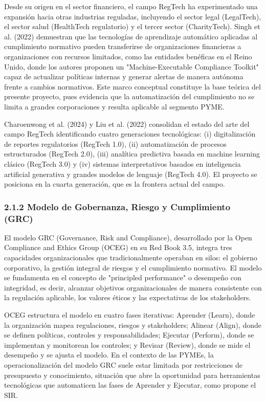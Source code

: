 \documentclass[12pt,a4paper,oneside]{report}
\begin{document}
Desde su origen en el sector financiero, el campo RegTech ha
experimentado una expansión hacia otras industrias reguladas, incluyendo
el sector legal (LegalTech), el sector salud (HealthTech regulatorio) y
el tercer sector (CharityTech). Singh et al. (2022) demuestran que las
tecnologías de aprendizaje automático aplicadas al cumplimiento
normativo pueden transferirse de organizaciones financieras a
organizaciones con recursos limitados, como las entidades benéficas en
el Reino Unido, donde los autores proponen un "Machine-Executable
Compliance Toolkit" capaz de actualizar políticas internas y generar
alertas de manera autónoma frente a cambios normativos. Este marco
conceptual constituye la base teórica del presente proyecto, pues
evidencia que la automatización del cumplimiento no se limita a grandes
corporaciones y resulta aplicable al segmento PYME.

Charoenwong et al. (2024) y Liu et al. (2022) consolidan el estado del
arte del campo RegTech identificando cuatro generaciones tecnológicas:
(i) digitalización de reportes regulatorios (RegTech 1.0), (ii)
automatización de procesos estructurados (RegTech 2.0), (iii) analítica
predictiva basada en machine learning clásico (RegTech 3.0) y (iv)
sistemas interpretativos basados en inteligencia artificial generativa y
grandes modelos de lenguaje (RegTech 4.0). El proyecto se posiciona en
la cuarta generación, que es la frontera actual del campo.

\subsubsection{2.1.2 Modelo de Gobernanza, Riesgo y Cumplimiento
(GRC)}\label{modelo-de-gobernanza-riesgo-y-cumplimiento-grc}

El modelo GRC (Governance, Risk and Compliance), desarrollado por la
Open Compliance and Ethics Group (OCEG) en su Red Book 3.5, integra tres
capacidades organizacionales que tradicionalmente operaban en silos: el
gobierno corporativo, la gestión integral de riesgos y el cumplimiento
normativo. El modelo se fundamenta en el concepto de "principled
performance" o desempeño con integridad, es decir, alcanzar objetivos
organizacionales de manera consistente con la regulación aplicable, los
valores éticos y las expectativas de los stakeholders.

OCEG estructura el modelo en cuatro fases iterativas: Aprender (Learn),
donde la organización mapea regulaciones, riesgos y stakeholders;
Alinear (Align), donde se definen políticas, controles y
responsabilidades; Ejecutar (Perform), donde se implementan y monitorean
los controles; y Revisar (Review), donde se mide el desempeño y se
ajusta el modelo. En el contexto de las PYMEs, la operacionalización del
modelo GRC suele estar limitada por restricciones de presupuesto y
conocimiento, situación que abre la oportunidad para herramientas
tecnológicas que automaticen las fases de Aprender y Ejecutar, como
propone el SIR.
\end{document}
